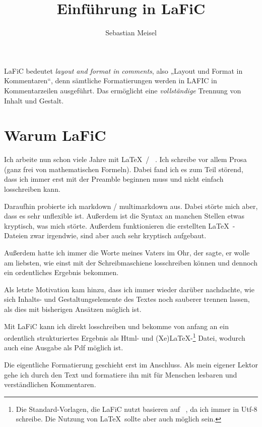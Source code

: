 \documentclass{scrartcl}
\title{Einführung in LaFiC}
\author{Sebastian Meisel}
\begin{document}
\maketitle


{LaFiC bedeutet \textit{layout and format in comments}, also „Layout
und Format in Kommentaren“, denn sämtliche Formatierungen
werden in LAFIC in Kommentarzeilen ausgeführt. Das
ermöglicht eine \emph{vollständige} Trennung von Inhalt und
Gestalt.\\}

\section{Warum LaFiC}

{Ich arbeite nun schon viele Jahre mit \LaTeX\  / \XeLaTeX\ . Ich
schreibe vor allem Prosa (ganz frei von mathematischen
Formeln). Dabei fand ich es zum Teil störend, dass ich immer
erst mit der Preamble beginnen muss und nicht einfach
losschreiben kann.\\}

{Daraufhin probierte ich markdown / multimarkdown aus. Dabei
störte mich aber, dass es sehr unflexible ist. Außerdem ist
die Syntax an manchen Stellen etwas kryptisch, was mich
störte. Außerdem funktionieren die erstellten \LaTeX\ -Dateien
zwar irgendwie, sind aber auch sehr kryptisch aufgebaut.\\}

{Außerdem hatte ich immer die Worte meines Vaters im Ohr, der
sagte, er wolle am liebsten, wie einst mit der
Schreibmaschiene losschreiben können und dennoch ein
ordentliches Ergebnis bekommen.\\}

{Als letzte Motivation kam hinzu, dass ich immer wieder
darüber nachdachte, wie sich Inhalts- und
Gestaltungselemente des Textes noch sauberer trennen lassen,
als dies mit bisherigen Ansätzen möglich ist.\\}

{Mit LaFiC kann ich direkt losschreiben und bekomme von
anfang an ein ordentlich strukturiertes Ergebnis als Html-
und (Xe)LaTeX-\footnote{Die Standard-Vorlagen, die LaFiC nutzt basieren auf \XeLaTeX\ , da ich immer in Utf-8 schreibe. Die Nutzung von \LaTeX\  sollte aber auch möglich sein.}\xspace Datei, wodurch auch eine Ausgabe als Pdf
möglich ist.\\}

{Die eigentliche Formatierung geschieht erst im
Anschluss. Als mein eigener Lektor gehe ich durch den Text
und formatiere ihn mit für Menschen lesbaren und
verständlichen Kommentaren.\\}
\end{document}
